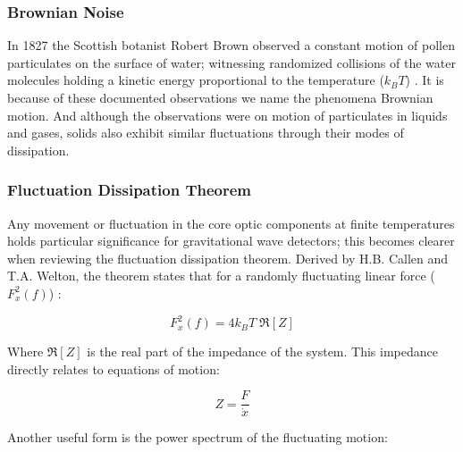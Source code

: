 \subsubsection*{Brownian Noise}
In 1827 the Scottish botanist Robert Brown observed a constant motion of pollen particulates on the surface of water; witnessing randomized collisions of the water molecules holding a kinetic energy proportional to the temperature ($k_BT$) \cite{brown:1828}. It is because of these documented observations we name the phenomena Brownian motion. And although the observations were on motion of particulates in liquids and gases, solids also exhibit similar fluctuations through their modes of dissipation. 

\subsubsection*{Fluctuation Dissipation Theorem}
Any movement or fluctuation in the core optic components at finite temperatures holds particular significance for gravitational wave detectors; this becomes clearer when reviewing the fluctuation dissipation theorem. Derived by H.B. Callen and T.A. Welton, the theorem states that for a randomly fluctuating linear force ($F_x^2(f)$) \cite{callen:1951}:


\begin{equation}
F_x^2(f) = 4 k_B T\; \Re[Z]
\end{equation}

\noindent Where $\Re[Z]$ is the real part of the impedance of the system. This impedance directly relates to equations of motion:

 \begin{equation}
 Z = \frac{F}{\dot{x}}
 \end{equation}

 \noindent Another useful form is the power spectrum of the fluctuating motion:

